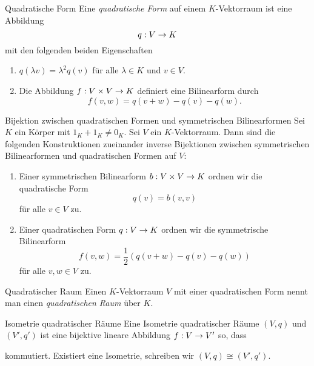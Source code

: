 \documentclass[main.tex]{subfiles}
\begin{document}
\begin{karte}{Quadratische Form}
    Eine \textit{quadratische Form} auf einem 
    \(K\)-Vektorraum ist eine Abbildung 
    \[ q : V \rightarrow K \] 
    mit den folgenden beiden Eigenschaften 
    \begin{enumerate}
        \item \( q(\lambda v) = \lambda^2 q(v) \) für alle 
        \( \lambda \in K \) und \(v\in V\).
        \item Die Abbildung \( f : V\times V \rightarrow K \) 
        definiert eine Bilinearform durch 
        \[ f(v,w) = q(v+w) -q(v) -q(w). \]
    \end{enumerate}
\end{karte}

\begin{karte}{Bijektion zwischen quadratischen Formen und symmetrischen Bilinearformen}
    Sei \(K\) ein Körper mit \( 1_K + 1_K \neq 0_K \). Sei 
    \(V\) ein \( K \)-Vektorraum. Dann sind die folgenden 
    Konstruktionen zueinander inverse Bijektionen zwischen 
    symmetrischen Bilinearformen und quadratischen Formen 
    auf \(V\):
    \begin{enumerate}
        \item Einer symmetrischen Bilinearform 
        \( b : V\times V \rightarrow K \) ordnen wir 
        die quadratische Form 
        \[ q(v) = b(v,v) \]
        für alle \( v\in V \) zu.
        \item Einer quadratischen Form \( q : V \rightarrow K \) 
        ordnen wir die symmetrische Bilinearform 
        \[ f(v,w) = \frac{1}{2} (q(v+w) - q(v) - q(w)) \] 
        für alle \(v,w\in V\) zu.
    \end{enumerate}
\end{karte}

\begin{karte}{Quadratischer Raum}
    Einen \(K\)-Vektorraum \(V\) mit einer quadratischen 
    Form nennt man einen \textit{quadratischen Raum} 
    über \(K\).
\end{karte}

\begin{karte}{Isometrie quadratischer Räume}
    Eine Isometrie quadratischer Räume 
    \((V,q)\) und \((V',q')\) ist eine bijektive 
    lineare Abbildung \( f : V \rightarrow V' \) so, 
    dass 
    \begin{center}
    \end{center}
    kommutiert. Existiert eine Isometrie, 
    schreiben wir \( (V,q) \cong (V',q') \).
\end{karte}
\end{document}
